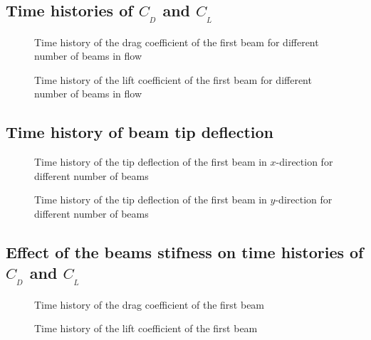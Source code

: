 \documentclass[preprint, letterpaper, nobibnotes, aps, superscriptaddress,prb]{revtex4-1}
\begin{document}
\subsection{Time histories of $C_{_D}$ and $C_{_L}$}

\begin{figure}[H]
  \centering {}
  \caption{Time history of the drag coefficient of the first beam for different number of beams in flow}\protect\label{fig:c_d}
\end{figure}
\begin{figure}[H]
  \centering {}
  \caption{Time history of the lift coefficient of the first beam for different number of beams in flow}\protect\label{fig:c_l}
\end{figure}

\subsection{Time history of beam tip deflection}
\begin{figure}[H]
  \centering {}
  \caption{Time history of the tip deflection of the first beam in $x$-direction for different number of beams}\protect\label{fig:d_x}
\end{figure}
\begin{figure}[H]
  \centering {}
  \caption{Time history of the tip deflection of the first beam in $y$-direction for different number of beams }\protect\label{fig:d_x}
\end{figure}


\subsection{Effect of the beams stifness on time histories of $C_{_D}$ and $C_{_L}$}

\begin{figure}[H]
  \centering {}
  \caption{Time history of the drag coefficient of the first beam}\protect\label{fig:c_d}
\end{figure}
\begin{figure}[H]
  \centering {}
  \caption{Time history of the lift coefficient of the first beam}\protect\label{fig:c_l}
\end{figure}
\end{document}
